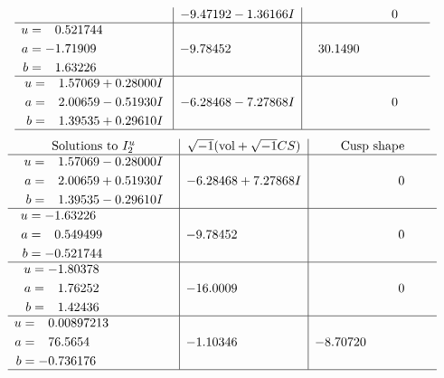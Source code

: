 \documentclass[1p]{elsarticle_modified}
\theoremstyle{definition}
\newcommand{\I}{\sqrt{-1}}
\begin{document}
$$\begin{array}{c|c|c}
 & -9.47192 - 1.36166 I & \phantom{-0.000000 } 0 \\ \hline\begin{aligned}
u &= \phantom{-}0.521744\phantom{ +0.000000I} \\
a &= -1.71909\phantom{ +0.000000I} \\
b &= \phantom{-}1.63226\phantom{ +0.000000I}\end{aligned}
 & -9.78452\phantom{ +0.000000I} & \phantom{-}30.1490\phantom{ +0.000000I} \\ \hline\begin{aligned}
u &= \phantom{-}1.57069 + 0.28000 I \\
a &= \phantom{-}2.00659 - 0.51930 I \\
b &= \phantom{-}1.39535 + 0.29610 I\end{aligned}
 & -6.28468 - 7.27868 I & \phantom{-0.000000 } 0\\
 \hline 
 \end{array}$$\newpage$$\begin{array}{c|c|c}  
\text{Solutions to }I^u_{2}& \I (\text{vol} + \sqrt{-1}CS) & \text{Cusp shape}\\
 \hline 
\begin{aligned}
u &= \phantom{-}1.57069 - 0.28000 I \\
a &= \phantom{-}2.00659 + 0.51930 I \\
b &= \phantom{-}1.39535 - 0.29610 I\end{aligned}
 & -6.28468 + 7.27868 I & \phantom{-0.000000 } 0 \\ \hline\begin{aligned}
u &= -1.63226\phantom{ +0.000000I} \\
a &= \phantom{-}0.549499\phantom{ +0.000000I} \\
b &= -0.521744\phantom{ +0.000000I}\end{aligned}
 & -9.78452\phantom{ +0.000000I} & \phantom{-0.000000 } 0 \\ \hline\begin{aligned}
u &= -1.80378\phantom{ +0.000000I} \\
a &= \phantom{-}1.76252\phantom{ +0.000000I} \\
b &= \phantom{-}1.42436\phantom{ +0.000000I}\end{aligned}
 & -16.0009\phantom{ +0.000000I} & \phantom{-0.000000 } 0 \\ \hline\begin{aligned}
u &= \phantom{-}0.00897213\phantom{ +0.000000I} \\
a &= \phantom{-}76.5654\phantom{ +0.000000I} \\
b &= -0.736176\phantom{ +0.000000I}\end{aligned}
 & -1.10346\phantom{ +0.000000I} & -8.70720\phantom{ +0.000000I}\\
 \hline 
 \end{array}$$\newpage\newpage\renewcommand{\arraystretch}{1}
\end{document}
